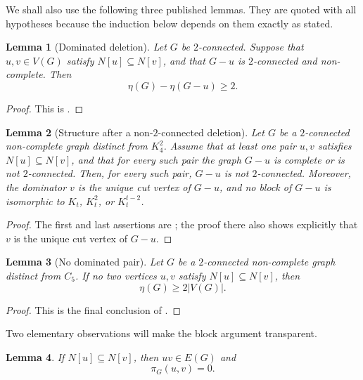 \documentclass[11pt,reqno]{amsart}
\newtheorem{lemma}[lemma]{Lemma}
\theoremstyle{definition}
\theoremstyle{remark}
\newcommand{\pairc}{\pi}
\begin{document}
We shall also use the following three published lemmas.  They are quoted with
all hypotheses because the induction below depends on them exactly as stated.

\begin{lemma}[Dominated deletion]\label{lem:published7}
Let $G$ be $2$-connected.  Suppose that $u,v\in V(G)$ satisfy
$N[u]\subseteq N[v]$, and that $G-u$ is $2$-connected and non-complete.  Then
\[
  \eta(G)-\eta(G-u)\ge 2.
\]
\end{lemma}

\begin{proof}
This is \cite[Lemma~7]{BKLPS}.
\end{proof}

\begin{lemma}[Structure after a non-$2$-connected deletion]\label{lem:published9}
Let $G$ be a $2$-connected non-complete graph distinct from $K_4^2$.
Assume that at least one pair $u,v$ satisfies $N[u]\subseteq N[v]$, and that
for every such pair the graph $G-u$ is complete or is not $2$-connected.
Then, for every such pair, $G-u$ is not $2$-connected.  Moreover, the
dominator $v$ is the unique cut vertex of $G-u$, and no block of $G-u$ is
isomorphic to $K_t$, $K_t^2$, or $K_t^{t-2}$.
\end{lemma}

\begin{proof}
The first and last assertions are \cite[Lemma~9]{BKLPS}; the proof there also
shows explicitly that $v$ is the unique cut vertex of $G-u$.
\end{proof}

\begin{lemma}[No dominated pair]\label{lem:published10}
Let $G$ be a $2$-connected non-complete graph distinct from $C_5$.  If no two
vertices $u,v$ satisfy $N[u]\subseteq N[v]$, then
\[
  \eta(G)\ge 2|V(G)|.
\]
\end{lemma}

\begin{proof}
This is the final conclusion of \cite[Lemma~10]{BKLPS}.
\end{proof}

Two elementary observations will make the block argument transparent.

\begin{lemma}\label{lem:pairzero}
If $N[u]\subseteq N[v]$, then $uv\in E(G)$ and
\[
  \pairc_G(u,v)=0.
\]
\end{lemma}
\end{document}
